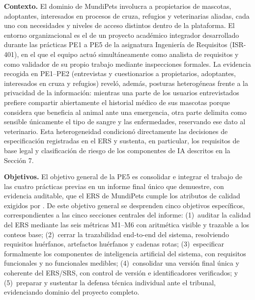 \documentclass[journal,onecolumn]{IEEEtran}
\begin{document}
	\textbf{Contexto.} El dominio de MundiPets involucra a propietarios de mascotas,
	adoptantes, interesados en procesos de cruza, refugios y veterinarias aliadas, cada
	uno con necesidades y niveles de acceso distintos dentro de la plataforma. El
	entorno organizacional es el de un proyecto académico integrador desarrollado
	durante las prácticas PE1 a PE5 de la asignatura Ingeniería de Requisitos
	(ISR-401), en el que el equipo actuó simultáneamente como analista de requisitos y
	como validador de su propio trabajo mediante inspecciones formales. La evidencia
	recogida en PE1--PE2 (entrevistas y cuestionarios a propietarios, adoptantes,
	interesados en cruza y refugios) reveló, además, posturas heterogéneas frente a la
	privacidad de la información: mientras una parte de los usuarios entrevistados
	prefiere compartir abiertamente el historial médico de sus mascotas porque considera
	que beneficia al animal ante una emergencia, otra parte delimita como sensible
	únicamente el tipo de sangre y las enfermedades, reservando ese dato al veterinario. Esta heterogeneidad condicionó directamente las decisiones de
	especificación registradas en el ERS y sustenta, en particular, los requisitos de
	base legal y clasificación de riesgo de los componentes de IA descritos en la
	Sección 7.
	
	\textbf{Objetivos.} El objetivo general de la PE5 es consolidar e integrar el
	trabajo de las cuatro prácticas previas en un informe final único que demuestre,
	con evidencia auditable, que el ERS de MundiPets cumple los atributos de calidad
	exigidos por \cite{ieee29148}. De este objetivo general se desprenden cinco
	objetivos específicos, correspondientes a las cinco secciones centrales del
	informe: (1)~auditar la calidad del ERS mediante las seis métricas M1--M6 con
	aritmética visible y trazable a los conteos base; (2)~cerrar la trazabilidad
	end-to-end del sistema, resolviendo requisitos huérfanos, artefactos huérfanos y
	cadenas rotas; (3)~especificar formalmente los componentes de inteligencia
	artificial del sistema, con requisitos funcionales y no funcionales medibles;
	(4)~consolidar una versión final única y coherente del ERS/SRS, con control de
	versión e identificadores verificados; y (5)~preparar y sustentar la defensa
	técnica individual ante el tribunal, evidenciando dominio del proyecto completo.
	
\end{document}

